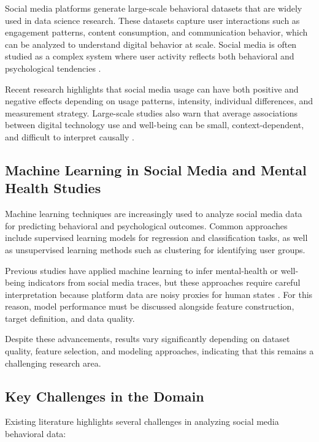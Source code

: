 \documentclass[12pt,a4paper]{article}
\begin{document}
Social media platforms generate large-scale behavioral datasets that are widely used in data science research. These datasets capture user interactions such as engagement patterns, content consumption, and communication behavior, which can be analyzed to understand digital behavior at scale. Social media is often studied as a complex system where user activity reflects both behavioral and psychological tendencies \cite{Dodds2011}.

Recent research highlights that social media usage can have both positive and negative effects depending on usage patterns, intensity, individual differences, and measurement strategy. Large-scale studies also warn that average associations between digital technology use and well-being can be small, context-dependent, and difficult to interpret causally \cite{Valkenburg2022,OrbenPrzybylski2019}.

\subsection{Machine Learning in Social Media and Mental Health Studies}

Machine learning techniques are increasingly used to analyze social media data for predicting behavioral and psychological outcomes. Common approaches include supervised learning models for regression and classification tasks, as well as unsupervised learning methods such as clustering for identifying user groups.

Previous studies have applied machine learning to infer mental-health or well-being indicators from social media traces, but these approaches require careful interpretation because platform data are noisy proxies for human states \cite{Chancellor2020,DeChoudhury2013}. For this reason, model performance must be discussed alongside feature construction, target definition, and data quality.

Despite these advancements, results vary significantly depending on dataset quality, feature selection, and modeling approaches, indicating that this remains a challenging research area.

\subsection{Key Challenges in the Domain}

Existing literature highlights several challenges in analyzing social media behavioral data:
\end{document}
